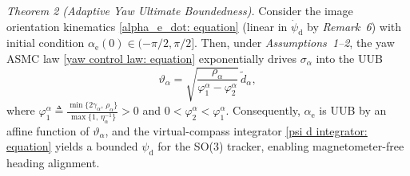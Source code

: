\documentclass{IEEEtaes}
\begin{document}
\textit{Theorem 2 (Adaptive Yaw Ultimate Boundedness).}
Consider the image orientation kinematics \eqref{alpha_e_dot: equation} (linear in $\dot{\psi}_\text{d}$ by \textit{Remark~6}) with initial condition $\alpha_\text{e}(0)\in(-\pi/2,\pi/2]$. Then, under \textit{Assumptions~1--2}, the yaw ASMC law \eqref{yaw control law: equation} exponentially drives $\sigma_\alpha$ into the UUB
\begin{equation} \label{yaw UUB bound: equation}
    \vartheta_\alpha = \sqrt{\frac{\rho_\alpha}{\varphi_1^\alpha-\varphi_2^\alpha}}\,\tilde{d}_\alpha,
\end{equation}
where $\varphi_1^\alpha \triangleq \frac{\min\{2\gamma_\alpha,\,\rho_\alpha\}}{\max\{1,\,\eta_\alpha^{-1}\}}>0$ and $0<\varphi_2^\alpha<\varphi_1^\alpha$. Consequently, $\alpha_\text{e}$ is UUB by an affine function of $\vartheta_\alpha$, and the virtual-compass integrator \eqref{psi d integrator: equation} yields a bounded $\psi_\text{d}$ for the SO(3) tracker, enabling magnetometer-free heading alignment.
\end{document}
